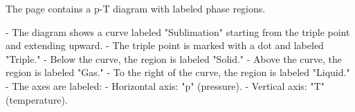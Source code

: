 The page contains a p-T diagram with labeled phase regions.  

- The diagram shows a curve labeled "Sublimation" starting from the triple point and extending upward.  
- The triple point is marked with a dot and labeled "Triple."  
- Below the curve, the region is labeled "Solid."  
- Above the curve, the region is labeled "Gas."  
- To the right of the curve, the region is labeled "Liquid."  
- The axes are labeled:  
  - Horizontal axis: "p" (pressure).  
  - Vertical axis: "T" (temperature).